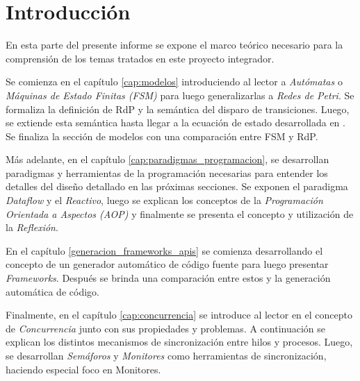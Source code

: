 \section*{Introducción}

En esta parte del presente informe se expone el marco teórico necesario para
la comprensión de los temas tratados en este proyecto integrador.

Se comienza en el capítulo \ref{cap:modelos} introduciendo al lector a
\textit{Autómatas} o \textit{Máquinas de Estado Finitas (FSM)} para luego
generalizarlas a \textit{Redes de Petri}. Se formaliza la definición de RdP y la
semántica del disparo de transiciones. Luego, se extiende esta semántica hasta
llegar a la ecuación de estado desarrollada en \cite{Ecuacion_generalizada_LAC}.
Se finaliza la sección de modelos con una comparación entre FSM y RdP.

Más adelante, en el capítulo \ref{cap:paradigmas_programacion}, se desarrollan
paradigmas y herramientas de la programación necesarias para entender los
detalles del diseño detallado en las próximas secciones. Se exponen el paradigma
\textit{Dataflow} y el \textit{Reactivo}, luego se explican los conceptos de la
\textit{Programación Orientada a Aspectos (AOP)} y finalmente se presenta el
concepto y utilización de la \textit{Reflexión}.

En el capítulo \ref{generacion_frameworks_apis} se comienza desarrollando el
concepto de un generador automático de código fuente para luego presentar
\textit{Frameworks}. Después se brinda una comparación entre estos y la
generación automática de código.

Finalmente, en el capítulo \ref{cap:concurrencia} se introduce al lector en el
concepto de \textit{Concurrencia} junto con sus propiedades y problemas. A
continuación se explican los distintos mecanismos de sincronización entre hilos
y procesos. Luego, se desarrollan \textit{Semáforos} y \textit{Monitores} como
herramientas de sincronización, haciendo especial foco en Monitores.
